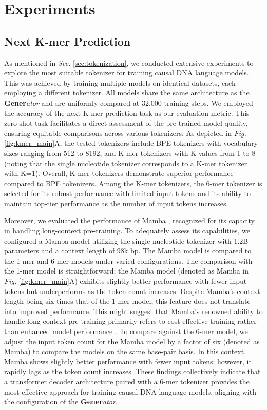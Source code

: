 \section{Experiments}
\label{sec:experiments}

\subsection{Next K-mer Prediction}
\label{sec:kmer_predition}


As mentioned in \textit{Sec.} \ref{sec:tokenization}, we conducted extensive experiments to explore the most suitable tokenizer for training causal DNA language models. This was achieved by training multiple models on identical datasets, each employing a different tokenizer. All models share the same architecture as the \textbf{Gener}\textit{ator} and are uniformly compared at 32,000 training steps. We employed the accuracy of the next K-mer prediction task as our evaluation metric. This zero-shot task facilitates a direct assessment of the pre-trained model quality, ensuring equitable comparisons across various tokenizers. As depicted in \textit{Fig.} \ref{fig:kmer_main}A, the tested tokenizers include BPE tokenizers with vocabulary sizes ranging from 512 to 8192, and K-mer tokenizers with K values from 1 to 8 (noting that the single nucleotide tokenizer corresponds to a K-mer tokenizer with K=1). Overall, K-mer tokenizers demonstrate superior performance compared to BPE tokenizers. Among the K-mer tokenizers, the 6-mer tokenizer is selected for its robust performance with limited input tokens and its ability to maintain top-tier performance as the number of input tokens increases.

Moreover, we evaluated the performance of Mamba \cite{Mamba,Mamba-2}, recognized for its capacity in handling long-context pre-training. To adequately assess its capabilities, we configured a Mamba model utilizing the single nucleotide tokenizer with 1.2B parameters and a context length of 98k bp. The Mamba model is compared to the 1-mer and 6-mer models under varied configurations. The comparison with the 1-mer model is straightforward; the Mamba model (denoted as Mamba in \textit{Fig.} \ref{fig:kmer_main}A) exhibits slightly better performance with fewer input tokens but underperforms as the token count increases. Despite Mamba's context length being six times that of the 1-mer model, this feature does not translate into improved performance. This might suggest that Mamba's renowned ability to handle long-context pre-training primarily refers to cost-effective training rather than enhanced model performance \cite{Empirical, DeciMamba}. To compare against the 6-mer model, we adjust the input token count for the Mamba model by a factor of six (denoted as Mamba) to compare the models on the same base-pair basis. In this context, Mamba shows slightly better performance with fewer input tokens; however, it rapidly lags as the token count increases. These findings collectively indicate that a transformer decoder architecture paired with a 6-mer tokenizer provides the most effective approach for training causal DNA language models, aligning with the configuration of the \textbf{Gener}\textit{ator}.

